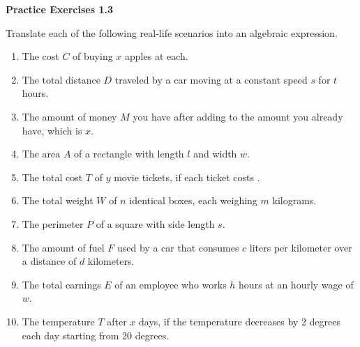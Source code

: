 \vspace{1ex}
\noindent\textbf{Practice Exercises 1.3}

\vspace{0.75ex}

Translate each of the following real-life scenarios into an algebraic expression. 
\begin{enumerate}
    \item The cost \( C \) of buying \( x \) apples at  each.
    \item The total distance \( D \) traveled by a car moving at a constant speed \( s \) for \( t \) hours.
    \item The amount of money \( M \) you have after adding  to the amount you already have, which is \( x \).
    \item The area \( A \) of a rectangle with length \( l \) and width \( w \).
    \item The total cost \( T \) of \( y \) movie tickets, if each ticket costs .
    \item The total weight \( W \) of \( n \) identical boxes, each weighing \( m \) kilograms.
    \item The perimeter \( P \) of a square with side length \( s \).
    \item The amount of fuel \( F \) used by a car that consumes \( c \) liters per kilometer over a distance of \( d \) kilometers.
    \item The total earnings \( E \) of an employee who works \( h \) hours at an hourly wage of \( w \).
    \item The temperature \( T \) after \( x \) days, if the temperature decreases by 2 degrees each day starting from 20 degrees.
\end{enumerate}